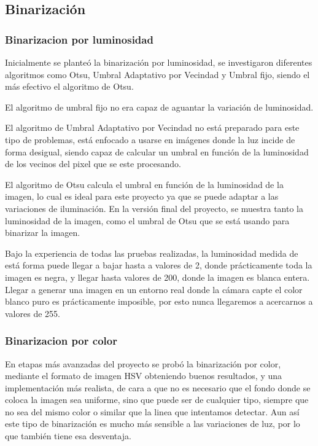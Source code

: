 \subsection{Binarización}
\subsubsection{Binarizacion por luminosidad}
Inicialmente se planteó la binarización por luminosidad, se investigaron diferentes algoritmos como Otsu, Umbral Adaptativo por Vecindad y Umbral fijo, siendo el más efectivo el algoritmo de Otsu. 

El algoritmo de umbral fijo no era capaz de aguantar la variación de luminosidad. 

El algoritmo de Umbral Adaptativo por Vecindad no está preparado para este tipo de problemas, está enfocado a usarse en imágenes donde la luz incide de forma desigual, siendo capaz de calcular un umbral en función de la luminosidad de los vecinos del pixel que se este procesando.

El algoritmo de Otsu calcula el umbral en función de la luminosidad de la imagen, lo cual es ideal para este proyecto ya que se puede adaptar a las variaciones de iluminación. En la versión final del proyecto, se muestra tanto la luminosidad de la imagen, como el umbral de Otsu que se está usando para binarizar la imagen.


Bajo la experiencia de todas las pruebas realizadas, la luminosidad medida de está forma puede llegar a bajar hasta a valores de 2, donde prácticamente toda la imagen es negra, y llegar hasta valores de 200, donde la imagen es blanca entera. Llegar a generar una imagen en un entorno real donde la cámara capte el color blanco puro es prácticamente imposible, por esto nunca llegaremos a acercarnos a valores de 255. 

\subsubsection{Binarizacion por color}

En etapas más avanzadas del proyecto se probó la binarización por color, mediante el formato de imagen HSV obteniendo buenos resultados, y una implementación más realista, de cara a que no es necesario que el fondo donde se coloca la imagen sea uniforme, sino que puede ser de cualquier tipo, siempre que no sea del mismo color o similar que la linea que intentamos detectar. Aun así este tipo de binarización es mucho más sensible a las variaciones de luz, por lo que también tiene esa desventaja.

